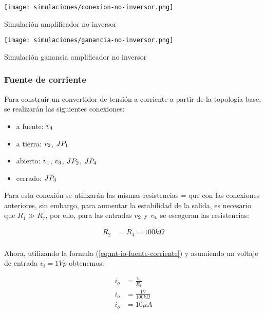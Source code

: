 \begin{ilustracion}[ht]
    \centering
    \texttt{[image: simulaciones/conexion-no-inversor.png]}
    \caption{Simulación amplificador no inversor}
    \label{ilus:sim-amp-no-inversor}
\end{ilustracion}

\begin{ilustracion}[ht]
    \centering
    \texttt{[image: simulaciones/ganancia-no-inversor.png]}
    \caption{Simulación ganancia amplificador no inversor}
    \label{ilus:sim-amp-no-inversor-ganancia}
\end{ilustracion}

\FloatBarrier
\subsubsection{Fuente de corriente}

Para construir un convertidor de tensión a corriente a partir de la topología base, se realizarán las siguientes conexiones:

\begin{itemize}
    \item a fuente: $\volt{4}$
    \item a tierra: $\volt{2}$, $\jumper{1}$
    \item abierto: $\volt{1}$, $\volt{3}$, $\jumper{2}$, $\jumper{4}$
    \item cerrado: $\jumper{3}$
\end{itemize}

Para esta conexión se utilizarán las mismas resistencias  =  que con las conexiones anteriores, sin embargo, para aumentar la estabilidad de la salida, es necesario que $R_1 \gg R_7$, por ello, para las entradas $\volt{2}$ y $\volt{4}$ se escogeran las resistencias:

\begin{align*}
    R_2 &= R_4 = 100k\Omega \\
\end{align*}

Ahora, utilizando la formula (\ref{eq:mt-io-fuente-corriente}) y asumiendo un voltaje de entrada $v_i = 1Vp$ obtenemos:

\begin{align*}
    i_o &= \frac{v_i}{R_1}  \\
    i_o &= \frac{1V}{100k\Omega}  \\
    i_o & = 10\mu A
\end{align*}

